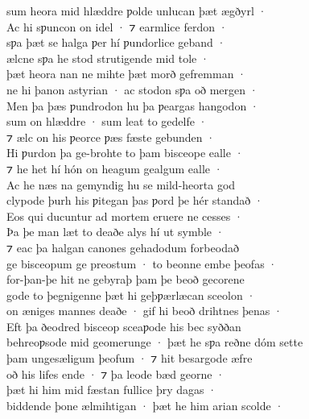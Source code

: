 \documentclass[10pt]{book}
\begin{document}
\settowidth{}

\begin{center}
\parbox{\pagelen}{
sum heora mid hl\ae{}ddre ƿolde unlucan þ\ae{}t \ae{}gðyrl · \\
Ac hi sƿuncon on idel · ⁊ earmlice ferdon · \\
sƿa þ\ae{}t se halga ƿer h\'i ƿundorlice geband · \\
\ae{}lcne sƿa he stod strutigende mid tole · \\
þ\ae{}t heora nan ne mihte þ\ae{}t morð gefremman · \\
ne hi þanon astyrian · ac stodon sƿa oð mergen · \\
Men þa þ\ae{}s ƿundrodon hu þa ƿeargas hangodon · \\
sum on hl\ae{}ddre · sum leat to gedelfe · \\
⁊ \ae{}lc on his ƿeorce ƿ\ae{}s f\ae{}ste gebunden · \\
Hi ƿurdon þa ge-brohte to þam bisceope ealle · \\
⁊ he het h\'i h\'on on heagum gealgum ealle · \\
Ac he n\ae{}s na gemyndig hu se mild-heorta god \\
clypode þurh his ƿitegan þas ƿord þe h\'er standað · \\
Eos qui ducuntur ad mortem eruere ne cesses · \\
Þa þe man l\ae{}t to deaðe alys h\'i ut symble · \\
⁊ eac þa halgan canones gehadodum forbeodað \\
ge bisceopum ge preostum · to beonne embe þeofas · \\
for-þan-þe hit ne gebyraþ þam þe beoð gecorene \\
gode to þegnigenne þ\ae{}t hi geþƿ\ae{}rl\ae{}can sceolon · \\
on \ae{}niges mannes deaðe · gif hi beoð drihtnes þenas · \\
Eft þa ðeodred bisceop sceaƿode his bec syððan \\
behreoƿsode mid geomerunge · þ\ae{}t he sƿa reðne d\'om sette \\
þam unges\ae{}ligum þeofum · ⁊ hit besargode \ae{}fre \\
oð his lifes ende · ⁊ þa leode b\ae{}d georne · \\
þ\ae{}t hi him mid f\ae{}stan fullice þry dagas · \\
biddende þone \ae{}lmihtigan · þ\ae{}t he him arian scolde · \\
}
\end{center}
\end{document}
